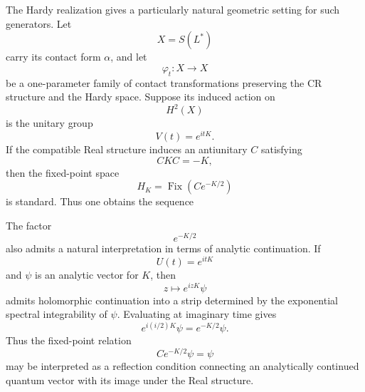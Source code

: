 \documentclass[a4paper,11pt]{article}
\theoremstyle{definition}
\begin{document}
The Hardy realization gives a particularly natural geometric setting for
such generators.  Let
\begin{equation}
    X=S(L^*)
\end{equation}
carry its contact form $\alpha$, and let
\begin{equation}
    \varphi_t:X\rightarrow X
\end{equation}
be a one-parameter family of contact transformations preserving the CR
structure and the Hardy space.  Suppose its induced action on
\begin{equation}
    H^2(X)
\end{equation}
is the unitary group
\begin{equation}
    V(t)=e^{itK}.
\end{equation}
If the compatible Real structure induces an antiunitary $C$ satisfying
\begin{equation}
    CKC=-K,
\end{equation}
then the fixed-point space
\begin{equation}
    H_K
    =
    \operatorname{Fix}
    \left(
    Ce^{-K/2}
    \right)
\end{equation}
is standard.  Thus one obtains the sequence
\begin{center}
\end{center}

The factor
\begin{equation}
    e^{-K/2}
\end{equation}
also admits a natural interpretation in terms of analytic continuation.  If
\begin{equation}
    U(t)=e^{itK}
\end{equation}
and $\psi$ is an analytic vector for $K$, then
\begin{equation}
    z\longmapsto e^{izK}\psi
\end{equation}
admits holomorphic continuation into a strip determined by the exponential
spectral integrability of $\psi$.  Evaluating at imaginary time gives
\begin{equation}
    e^{i(i/2)K}\psi
    =
    e^{-K/2}\psi.
\end{equation}
Thus the fixed-point relation
\begin{equation}
    Ce^{-K/2}\psi=\psi
    \label{eq:ssgq:reflectioncondition}
\end{equation}
may be interpreted as a reflection condition connecting an analytically
continued quantum vector with its image under the Real structure.
\end{document}
